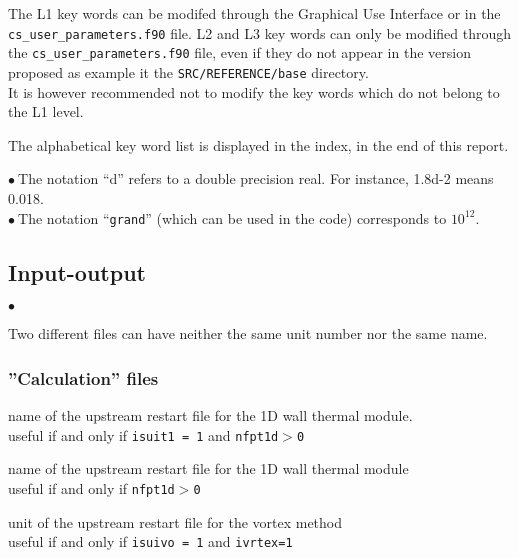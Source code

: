 The L1 key words can be modifed through the Graphical Use Interface or
in the \texttt{cs\_user\_parameters.f90} file. L2 and L3 key words can only be modified through
the \texttt{cs\_user\_parameters.f90} file, even if they do not appear in the version proposed
as example it the \texttt{SRC/REFERENCE/base} directory.\\
It is however recommended not to modify the key words which do not belong to the L1
level.

The alphabetical key word list is displayed in the index, in the end of
this report.

$\bullet\ $The notation ``d'' refers to a double precision real. For
           instance, 1.8d-2 means 0.018. \\
$\bullet\ $The notation ``{\tt grand}'' (which can be used in the code)
corresponds to $10^{12}$.

\subsection{Input-output}

\begin{list}{$\bullet$}{}
\item Two different files can have neither the same unit number nor the
      same name.
\end{list}

\subsubsection{''Calculation'' files}




{name of the upstream restart file for the 1D wall thermal module.\\
useful if and only if {\tt isuit1 = 1} and {\tt nfpt1d$>$0}}

{name of the upstream restart file for the 1D wall thermal module\\
useful if and only if {\tt nfpt1d$>$0}}


{unit of the upstream restart file for the vortex method\\
useful if and only if {\tt isuivo = 1} and {\tt ivrtex=1}}

